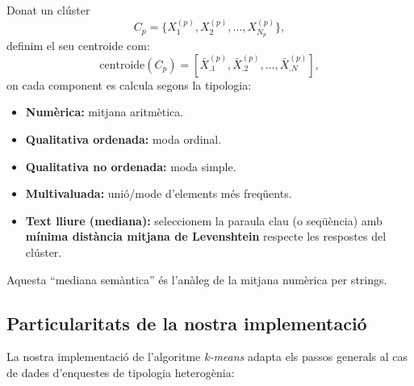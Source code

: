 \documentclass[a4paper,11pt]{article}
\begin{document}
Donat un clúster
\[
  C_p = \{X_{1}^{(p)}, X_{2}^{(p)}, \dots, X_{N_p}^{(p)}\},
\]
definim el seu centroide com:
\[
  \text{centroide}(C_p)=
  [\bar{X}_{.1}^{(p)}, \bar{X}_{.2}^{(p)}, \dots, \bar{X}_{.N}^{(p)}],
\]
on cada component es calcula segons la tipologia:

\begin{itemize}
  \item \textbf{Numèrica:} mitjana aritmètica.
  \item \textbf{Qualitativa ordenada:} moda ordinal.
  \item \textbf{Qualitativa no ordenada:} moda simple.
  \item \textbf{Multivaluada:} unió/mode d’elements més freqüents.
  \item \textbf{Text lliure (mediana):}
        seleccionem la paraula clau (o seqüència) amb
        \textbf{mínima distància mitjana de Levenshtein} respecte les respostes del clúster.
\end{itemize}

Aquesta “mediana semàntica” és l’anàleg de la mitjana numèrica per strings.

\subsection{Particularitats de la nostra implementació}

La nostra implementació de l’algoritme \textit{k-means} adapta els passos generals al cas de dades d’enquestes de tipologia heterogènia:
\end{document}
